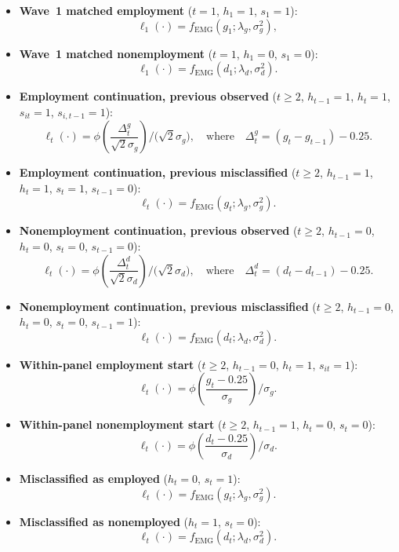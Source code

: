 \documentclass[12pt]{article}
\begin{document}
\begin{itemize}
\item \textbf{Wave~1 matched employment} (\(t=1\), \(h_1=1\), \(s_{1}=1\)):
\[
\ell_1(\cdot) = f_{\mathrm{EMG}}(g_{1};\lambda_g,\sigma_g^2),
\]


\item \textbf{Wave~1 matched nonemployment} (\(t=1\), \(h_1=0\), \(s_{1}=0\)):
\[
\ell_1(\cdot) = f_{\mathrm{EMG}}(d_{1};\lambda_d,\sigma_d^2).
\]
\item \textbf{Employment continuation, previous observed} (\(t\ge 2\), \(h_{t-1}=1\), \(h_t=1\), \(s_{it}=1\), \(s_{i,t-1}=1\)):
\[
\ell_t(\cdot) = \phi\!\left(\frac{\Delta^g_{t}}{\sqrt{2}\sigma_g}\right)\Big/\!\big(\sqrt{2}\sigma_g\big),
\quad\text{where}\quad \Delta^g_{t} = (g_{t}-g_{t-1}) - 0.25.
\]

\item \textbf{Employment continuation, previous misclassified} (\(t\ge 2\), \(h_{t-1}=1\), \(h_t=1\), \(s_{t}=1\), \(s_{t-1}=0\)):
\[
\ell_t(\cdot) = f_{\mathrm{EMG}}(g_{t};\lambda_g,\sigma_g^2).
\]

\item \textbf{Nonemployment continuation, previous observed} (\(t\ge 2\), \(h_{t-1}=0\), \(h_t=0\), \(s_{t}=0\), \(s_{t-1}=0\)):
\[
\ell_t(\cdot) = \phi\!\left(\frac{\Delta^d_{t}}{\sqrt{2}\sigma_d}\right)\Big/\!\big(\sqrt{2}\sigma_d\big),
\quad\text{where}\quad \Delta^d_{t} = (d_{t}-d_{t-1}) - 0.25.
\]

\item \textbf{Nonemployment continuation, previous misclassified} (\(t\ge 2\), \(h_{t-1}=0\), \(h_t=0\), \(s_{t}=0\), \(s_{t-1}=1\)):
\[
\ell_t(\cdot) = f_{\mathrm{EMG}}(d_{t};\lambda_d,\sigma_d^2).
\]


\item \textbf{Within-panel employment start} (\(t\ge 2\), \(h_{t-1}=0\), \(h_t=1\), \(s_{it}=1\)):
\[
\ell_t(\cdot) = \phi\!\left(\frac{g_{t}-0.25}{\sigma_g}\right)\Big/\sigma_g.
\]

\item \textbf{Within-panel nonemployment start} (\(t\ge 2\), \(h_{t-1}=1\), \(h_t=0\), \(s_{t}=0\)):
\[
\ell_t(\cdot) = \phi\!\left(\frac{d_{t}-0.25}{\sigma_d}\right)\Big/\sigma_d.
\]

\item \textbf{Misclassified as employed} (\(h_t=0\), \(s_{t}=1\)):
\[
\ell_t(\cdot) = f_{\mathrm{EMG}}(g_{t};\lambda_g,\sigma_g^2).
\]

\item \textbf{Misclassified as nonemployed} (\(h_t=1\), \(s_{t}=0\)):
\[
\ell_t(\cdot) = f_{\mathrm{EMG}}(d_{t};\lambda_d,\sigma_d^2).
\]
\end{itemize}
\end{document}
